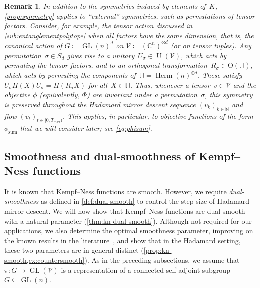 \documentclass[11pt,letterpaper]{article}
\newtheorem{remark}[theorem]{Remark}\AddToHook{env/remark/begin}{\crefalias{theorem}{remark}}
\numberwithin{equation}{section}
\newcommand{\op}{\oplus}
\newcommand{\CC}{\mathbb{C}}
\newcommand{\NN}{\mathbb{N}}
\newcommand{\bbH}{\mathbb{H}}
\newcommand{\VV}{\mathcal{V}}
\DeclareMathOperator{\U}{U}
\DeclareMathOperator{\GL}{GL}
\DeclareMathOperator{\Herm}{Herm}
\DeclareMathOperator{\Sum}{sum}
\begin{document}
\begin{remark}\label{rem:tensor symmetries}
In addition to the symmetries induced by elements of~$K$, \cref{prop:symmetry} applies to ``external'' symmetries, such as permutations of tensor factors.
Consider, for example, the tensor action discussed in \cref{sub:entanglementpolytope} when all factors have the same dimension, that is, the canonical action of $G \coloneqq \GL(n)^d$ on $\VV\coloneqq (\CC^n)^{\otimes d}$ (or on tensor tuples).
Any permutation~$\sigma\in S_d$ gives rise to a unitary~$U_\sigma\in \U(\VV)$, which acts by permuting the tensor factors, and to an orthogonal transformation~$R_\sigma \in \mathrm{O}(\bbH)$, which acts by permuting the components of~$\bbH=\Herm(n)^{\op d}$.
These satisfy $U_{\sigma}\Pi(X)U_{\sigma}^\dag=\Pi(R_{\sigma}X)$ for all~$X\in\bbH$.
Thus, whenever a tensor~$v \in \VV$ and the objective $\phi$ (equivalently, $\Phi$) are invariant under a permutation~$\sigma$, this symmetry is preserved throughout the Hadamard mirror descent sequence $(v_k)_{k\in\NN}$ and flow $(v_t)_{t\in [0,T_{\max})}$.
This applies, in particular, to objective functions of the form $\phi_{\Sum}$ that we will consider later; see \cref{eq:phisum}.
\end{remark}

\subsection{Smoothness and dual-smoothness of Kempf--Ness functions}\label{sub:dualsmooth}
It is known that Kempf--Ness functions are smooth.
However, we require \emph{dual-smoothness} as defined in \cref{def:dual smooth} to control the step size of Hadamard mirror descent.
We will now show that Kempf--Ness functions are dual-smooth with a natural parameter (\cref{thm:kn-dual-smooth}).
Although not required for our applications, we also determine the optimal smoothness parameter, improving on the known results in the literature~\cite{BFGOWW2019,HiraiSakabe2024}, and show that in the Hadamard setting, these two parameters are in general distinct (\cref{prop:kn-smooth,ex:countersmooth}).
As in the preceding subsections, we assume that~$\pi\colon G \to \GL(\VV)$ is a representation of a connected self-adjoint subgroup~$G\subseteq\GL(n)$.
\end{document}
